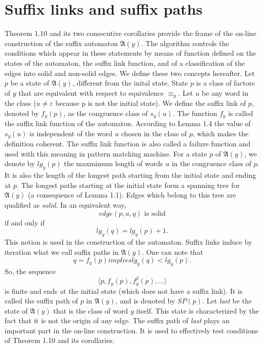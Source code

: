\documentclass[11pt]{report}
\begin{document}
\section{Suffix links and suffix paths}
Theorem 1.10 and its two consecutive corollaries provide the frame of
the on-line construction of the suffix automaton
$\mathfrak{A}(y)$. The algorithm controls the conditions which appear
in these statements by means of function defined on the states of the
automaton, the suffix link function, and of a classification of the
edges into solid and non-solid edges. We define these two concepts
hereafter.
Let $p$ be a state of $\mathfrak{A}(y)$, different from the inital
state. State $p$ is a class of factors of $y$ that are equivalent with
respect to equivalence $\equiv_y$. Let $u$ be any word in the class
($u \not= \varepsilon$ because p is not the initial state). We define
the suffix link of $p$, denoted by $f_y(p)$, as the congruence class
of $s_y(u)$. The function $f_y$ is called the suffix link function of
the automaton. According to Lemma 1.4 the value of $s_y(u)$ is
independent of the word $u$ chosen in the class of $p$, which makes
the definition coherent. The suffix link function is also called a
failure function and used with this meaning in pattern matching
machine.
For a state $p$ of $\mathfrak{A}(y)$, we denote by $lg_y(p)$ the
maxmimum length of words $u$ in the congruence class of $p$. It is
also the length of the longest path starting from the initial state
and ending at $p$. The longest paths starting at the initial state
form a spanning tree for $\mathfrak{A}(y)$ (a consequence of Lemma
1.1). Edges which belong to this tree are qualified as
\textit{solid}. In an equivalent way, $$edge(p, a, q) \text{ is
  solid}$$ if and only if $$lg_y(q) = lg_y(p) + 1.$$ This notion is
used in the construction of the automaton.
Suffix links induce by iteration what we call suffix paths in
$\mathfrak{A}(y)$. One can note that $$q = f_y(p) implies lg_y(q) <
lg_y(p).$$ So, the sequence $$\langle p, f_y(p),f_y^2(p),... \rangle$$
is finite and ends at the initial state (which does not have a suffix
link). It is called the suffix path of $p$ in $\mathfrak{A}(y)$, and
is denoted by $\textit{SP}(p)$.
Let \textit{last} be the state of $\mathfrak{A}(y)$ that is the class
of word $y$ itself. This state is characterized by the fact that it is
not the origin of any edge. The suffix path of \textit{last} plays an
important part in the on-line construction. It is used to effectively
test conditions of Theorem 1.10 and its corollaries.\\
\end{document}
